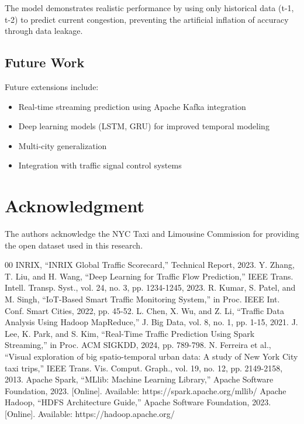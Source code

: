 \documentclass[conference]{IEEEtran}
\begin{document}
The model demonstrates realistic performance by using only historical data (t-1, t-2) to predict current congestion, preventing the artificial inflation of accuracy through data leakage.

\subsection{Future Work}

Future extensions include:
\begin{itemize}
    \item Real-time streaming prediction using Apache Kafka integration
    \item Deep learning models (LSTM, GRU) for improved temporal modeling
    \item Multi-city generalization
    \item Integration with traffic signal control systems
\end{itemize}

\section*{Acknowledgment}

The authors acknowledge the NYC Taxi and Limousine Commission for providing the open dataset used in this research.

\begin{thebibliography}{00}
 INRIX, ``INRIX Global Traffic Scorecard,'' Technical Report, 2023.
 Y. Zhang, T. Liu, and H. Wang, ``Deep Learning for Traffic Flow Prediction,'' IEEE Trans. Intell. Transp. Syst., vol. 24, no. 3, pp. 1234-1245, 2023.
 R. Kumar, S. Patel, and M. Singh, ``IoT-Based Smart Traffic Monitoring System,'' in Proc. IEEE Int. Conf. Smart Cities, 2022, pp. 45-52.
 L. Chen, X. Wu, and Z. Li, ``Traffic Data Analysis Using Hadoop MapReduce,'' J. Big Data, vol. 8, no. 1, pp. 1-15, 2021.
 J. Lee, K. Park, and S. Kim, ``Real-Time Traffic Prediction Using Spark Streaming,'' in Proc. ACM SIGKDD, 2024, pp. 789-798.
 N. Ferreira et al., ``Visual exploration of big spatio-temporal urban data: A study of New York City taxi trips,'' IEEE Trans. Vis. Comput. Graph., vol. 19, no. 12, pp. 2149-2158, 2013.
 Apache Spark, ``MLlib: Machine Learning Library,'' Apache Software Foundation, 2023. [Online]. Available: https://spark.apache.org/mllib/
 Apache Hadoop, ``HDFS Architecture Guide,'' Apache Software Foundation, 2023. [Online]. Available: https://hadoop.apache.org/
\end{thebibliography}
\end{document}
